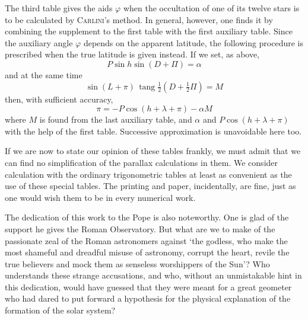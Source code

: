 The third table gives the aids $\varphi$ when the occultation of one of its twelve stars is to be calculated by \textsc{Carlini}’s method. In general, however, one finds it by combining the supplement to the first table with the first auxiliary table. Since the auxiliary angle $\varphi$ depends on the apparent latitude, the following procedure is prescribed when the true latitude is given instead. If we set, as above,
\[
P \sin h \sin(D+\Pi) = \alpha
\]
and at the same time
\[
\sin(L+\pi)\,\operatorname{tang}\tfrac{1}{2}(D+\tfrac{1}{2}\Pi) = M
\]
then, with sufficient accuracy,
\[
\pi = -P\cos(h+\lambda+\pi) - \alpha M
\]
where $M$ is found from the last auxiliary table, and $\alpha$ and $P\cos(h+\lambda+\pi)$ with the help of the first table. Successive approximation is unavoidable here too.

If we are now to state our opinion of these tables frankly, we must admit that we can find no simplification of the parallax calculations in them. We consider calculation with the ordinary trigonometric tables at least as convenient as the use of these special tables. The printing and paper, incidentally, are fine, just as one would wish them to be in every numerical work.

The dedication of this work to the Pope is also noteworthy. One is glad of the support he gives the Roman Observatory. But what are we to make of the passionate zeal of the Roman astronomers against ‘the godless, who make the most shameful and dreadful misuse of astronomy, corrupt the heart, revile the true believers and mock them as senseless worshippers of the Sun’? Who understands these strange accusations, and who, without an unmistakable hint in this dedication, would have guessed that they were meant for a great geometer who had dared to put forward a hypothesis for the physical explanation of the formation of the solar system?
\par\clearpage\endgroup
